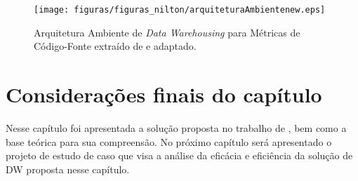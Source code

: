 	\begin{figure}[h!]
\centering
\texttt{[image: figuras/figuras\_nilton/arquiteturaAmbientenew.eps]}
\caption{Arquitetura Ambiente de \textit{Data Warehousing} para Métricas de Código-Fonte extraído de  e adaptado.}
\label{fig:arquiteturaAmbientenew}
\end{figure}
\FloatBarrier

\section{Considerações finais do capítulo}

Nesse capítulo foi apresentada a solução proposta no trabalho de , bem como a base teórica para sua compreensão. No próximo capítulo será apresentado o projeto de estudo de caso que visa a análise da eficácia e eficiência da solução de DW proposta nesse capítulo.
